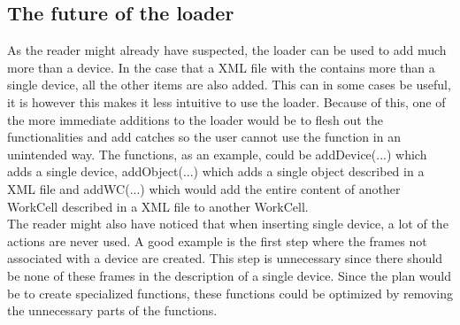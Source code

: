 \subsection{The future of the loader}
As the reader might already have suspected, the loader can be used to add much more than a device. In the case that a XML file with the contains more than a single device, all the other items are also added. This can in some cases be useful, it is however this makes it less intuitive to use the loader. Because of this, one of the more immediate additions to the loader would be to flesh out the functionalities and add catches so the user cannot use the function in an unintended way. The functions, as an example, could be addDevice(...) which adds a single device, addObject(...) which adds a single object described in a XML file and addWC(...) which would add the entire content of another WorkCell described in a XML file to another WorkCell.\\
The reader might also have noticed that when inserting single device, a lot of the actions are never used. A good example is the first step where the frames not associated with a device are created. This step is unnecessary since there should be none of these frames in the description of a single device. Since the plan would be to create specialized functions, these functions could be optimized by removing the unnecessary parts of the functions.
